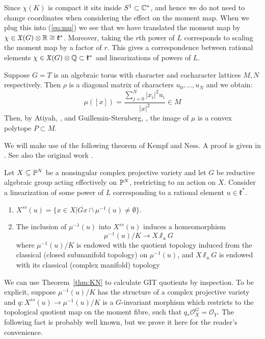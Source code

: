 Since \(\chi(K)\) is compact it sits inside \(S^1 \subset \mathbb{C}^*\), and hence we do not need to change coordinates when considering the effect on the moment map. When we plug this into (\ref{eq:mu}) we see that we have translated the moment map by \(\chi \in \mathfrak{X}(G) \otimes \mathbb{R} \cong \mathfrak{k}^*\). Moreover, taking the \(r\)th power of \(L\) corresponds to scaling the moment map by a factor of \(r\). This gives a correspondence between rational elements \(\chi \in \mathfrak{X}(G) \otimes \mathbb{Q} \subset \mathfrak{k}^*\) and linearizations of powers of \(L\).
\begin{example}
Suppose \(G = T\) is an algebraic torus with character and cocharacter lattices \(M,N\) respectively. Then \(\rho\) is a diagonal matrix of characters \(u_0,\dots,u_{N}\) and we obtain:
\[
\mu([x]) = \frac{\sum_{j=0}^N |x_i|^2 u_i}{|x|^2} \in M
\]
Then, by Atiyah, \cite{atiyah1982convexity}, and Guillemin-Sternberg, \cite{guillemin1982convexity}, the image of \(\mu\) is a convex polytope \(P \subset M\).
\end{example}
%
%
%
We will make use of the following theorem of Kempf and Ness. A proof is given in \cite[Chapter 8]{mumford1994}. See also the original work \cite{kempf1979}.
\begin{theorem}\label{thm:KN}
Let \(X \subseteq \mathbb{P}^N\) be a nonsingular complex projective variety and let \(G\) be reductive algebraic group acting effectively on \(\mathbb{P}^N\), restricting to an action on \(X\). Consider a linearization of some power of \(L\) corresponding to a rational element \(u \in \mathfrak{k}^*\).
\begin{enumerate}
\item \(X^{ss}(u) = \{ x \in X | \overline{Gx} \cap \mu^{-1}(u) \neq \emptyset \} \). \\
\item The inclusion of \(\mu^{-1}(u)\) into \(X^{ss}(u)\) induces a homeomorphism
\[
\mu^{-1}(u)/K \to X\sslash_u G
\]
where \(\mu^{-1}(u)/K\) is endowed with the quotient topology induced from the classical (closed submanifold topology) on \(\mu^{-1}(u)\), and \(X \sslash_u G\) is endowed with its classical (complex manifold) topology
\end{enumerate}
\end{theorem}
%
%
%
We can use Theorem~\ref{thm:KN} to calculate GIT quotients by inspection. To be explicit, suppose \(\mu^{-1}(u)/K\) has the structure of a complex projective variety and \(q: X^{ss}(u) \to \mu^{-1}(u)/K\) is a \(G\)-invariant morphism which restricts to the topological quotient map on the moment fibre, such that \(q_* \mathcal{O}_X^G = \mathcal{O}_Y\). The following fact is probably well known, but we prove it here for the reader's convenience.
